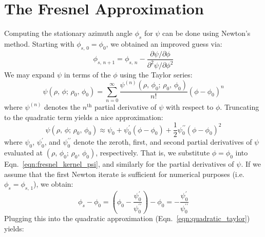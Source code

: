 \documentclass{article}
\begin{document}
    \section{The Fresnel Approximation}
        Computing the stationary azimuth angle $\phi_{s}$ for $\psi$ can be
        done using Newton's method. Starting with
        $\phi_{s,\,0}=\phi_{0}$, we obtained an improved guess via:
        \begin{equation}
            \phi_{s,\,n+1}=\phi_{s,\,n}-
            \frac{\partial\psi/\partial\phi}
                 {\partial^{2}\psi/\partial\phi^{2}}
        \end{equation}
        We may expand $\psi$ in terms of the $\phi$ using the Taylor
        series:
        \begin{equation}
            \psi(\rho,\,\phi;\,\rho_{0},\,\phi_{0})
            =\sum_{n=0}^{\infty}
                \frac{\psi^{(n)}(\rho,\,\phi_{0};\,\rho_{0},\,\phi_{0})}{n!}
                (\phi-\phi_{0})^{n}
        \end{equation}
        where $\psi^{(n)}$ denotes the $n^{\textrm{th}}$ partial derivative of
        $\psi$ with respect to $\phi$. Truncating to the quadratic term yields
        a nice approximation:
        \begin{equation}
            \label{eqn:quadratic_taylor}
            \psi(\rho,\,\phi;\,\rho_{0},\,\phi_{0})
            \approx
            \psi_{0}+\psi^{\prime}_{0}(\phi-\phi_{0})
            +\frac{1}{2}\psi^{\prime\prime}_{0}(\phi-\phi_{0})^{2}
        \end{equation}
        where $\psi_{0}$, $\psi^{\prime}_{0}$, and $\psi^{\prime\prime}_{0}$
        denote the zeroth, first, and second partial derivatives of $\psi$
        evaluated at $(\rho,\,\phi_{0};\,\rho_{0},\,\phi_{0})$, respectively.
        That is, we substitute $\phi=\phi_{0}$ into
        Eqn.~\ref{eqn:fresnel_kernel_psi}, and similarly for the partial
        derivatives of $\psi$.
        If we assume that the first Newton iterate is sufficient for numerical
        purposes (i.e. $\phi_{s}=\phi_{s,\,1}$), we obtain:
        \begin{equation}
            \phi_{s}-\phi_{0}
            =\left(
                \phi_{0}-
                \frac{\psi^{\prime}_{0}}{\psi^{\prime\prime}_{0}}
            \right)-\phi_{0}
            =-\frac{\psi^{\prime}_{0}}{\psi^{\prime\prime}_{0}}
        \end{equation}
        Plugging this into the quadratic approximation
        (Eqn.~\ref{eqn:quadratic_taylor}) yields:
\end{document}
